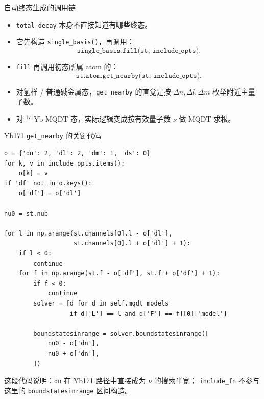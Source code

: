 \documentclass[aspectratio=169,11pt]{ctexbeamer}
\begin{document}
\begin{frame}{自动终态生成的调用链}
  \begin{itemize}
    \item \texttt{total\_decay} 本身不直接知道有哪些终态。
    \item 它先构造 \texttt{single\_basis()}，再调用：
      \[
        \texttt{single\_basis.fill(st, include\_opts)}.
      \]
    \item \texttt{fill} 再调用初态所属 atom 的：
      \[
        \texttt{st.atom.get\_nearby(st, include\_opts)}.
      \]
    \item 对氢样 / 普通碱金属态，\texttt{get\_nearby} 的直觉是按
      \(\Delta n,\Delta l,\Delta m\) 枚举附近主量子数。
    \item 对 \({}^{171}\mathrm{Yb}\) MQDT 态，实际逻辑变成按有效量子数 \(\nu\) 做 MQDT 求根。
  \end{itemize}
\end{frame}

\begin{frame}[fragile]{Yb171 \texttt{get\_nearby} 的关键代码}
  \tiny
  \begin{verbatim}
o = {'dn': 2, 'dl': 2, 'dm': 1, 'ds': 0}
for k, v in include_opts.items():
    o[k] = v
if 'df' not in o.keys():
    o['df'] = o['dl']

nu0 = st.nub

for l in np.arange(st.channels[0].l - o['dl'],
                   st.channels[0].l + o['dl'] + 1):
    if l < 0:
        continue
    for f in np.arange(st.f - o['df'], st.f + o['df'] + 1):
        if f < 0:
            continue
        solver = [d for d in self.mqdt_models
                  if d['L'] == l and d['F'] == f][0]['model']

        boundstatesinrange = solver.boundstatesinrange([
            nu0 - o['dn'],
            nu0 + o['dn'],
        ])
  \end{verbatim}

  \vspace{-0.7em}
  这段代码说明：\texttt{dn} 在 Yb171 路径中直接成为 \(\nu\) 的搜索半宽；
  \texttt{include\_fn} 不参与这里的 \texttt{boundstatesinrange} 区间构造。
\end{frame}
\end{document}
